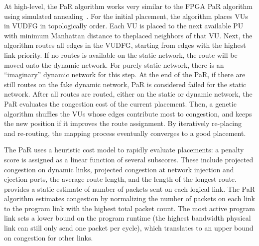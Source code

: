At high-level, the PaR algorithm works very similar to the FPGA PaR algorithm using
simulated annealing~\cite{simanneal}. 
For the initial placement, the algorithm places VUs in VUDFG in topologically order.
Each VU is placed to the next available PU with minimum Manhattan distance to theplaced
neighbors of that VU.
Next, the algorithm routes all edges in the VUDFG, starting from edges with the highest link
priority. If no routes is available on the static network, the route will be moved onto the dynamic
network. For purely static network, there is an ``imaginary'' dynamic network for this step.
At the end of the PaR, if there are still routes on the fake dynamic network, PaR is considered
failed for the static network.
After all routes are routed, either on the static or dynamic network, the PaR evaluates the
congestion cost of the current placement.
Then, a genetic algorithm shuffles the VUs whose edges contribute most to congestion, 
and keeps the new position if it improves the route assignment.
By iteratively re-placing and re-routing, the mapping process eventually converges to a good placement.

The PaR uses a heuristic cost model to rapidly evaluate placements: a 
penalty score is assigned as a linear function of several subscores.
These include projected congestion on dynamic links, projected congestion at network injection and ejection ports, the average route length, and the length of the longest route.
\name provides a static estimate of number of packets sent on each logical link.
The PaR algorithm estimates congestion by normalizing the number of packets on each link to the program link with the highest total packet count.
The most active program link sets a lower bound on the program runtime (the highest bandwidth physical link can still only send one packet per cycle), which translates to an upper bound on congestion for other links.


